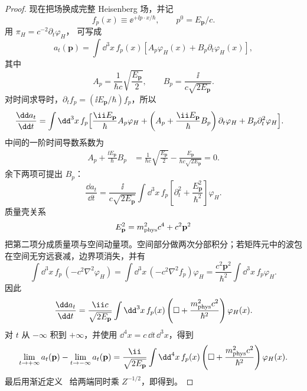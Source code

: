 \begin{proof}
现在把场换成完整 Heisenberg 场，并记
\begin{equation*}
 f_p(x)\equiv \ee^{+\ii p\cdot x/\hbar},
 \qquad p^0=E_{\mathbf p}/c.
\end{equation*}
用 $\pi_H=c^{-2}\partial_t\varphi_H$， 可写成
\begin{equation*}
 a_t(\mathbf p)
 =\int\dd^3 x\,f_p(x)
 \left[
 A_p\varphi_H(x)+B_p\partial_t\varphi_H(x)
 \right],
\end{equation*}
其中
\begin{equation*}
 A_p=\frac{1}{\hbar c}\sqrt{\frac{E_{\mathbf p}}{2}},
 \qquad
 B_p=\frac{\ii}{c\sqrt{2E_{\mathbf p}}}.
\end{equation*}
对时间求导时，$\partial_t f_p=(\ii E_{\mathbf p}/\hbar)f_p$，所以
\begin{align*}
 \frac{\dd a_t}{\dd t}
 =\int\dd^3 x\,f_p
 \Bigl[&\frac{\ii E_{\mathbf p}}{\hbar}A_p\varphi_H
 +\left(A_p+\frac{\ii E_{\mathbf p}}{\hbar}B_p\right)
 \partial_t\varphi_H
 +B_p\partial_t^2\varphi_H\Bigr].
\end{align*}
中间的一阶时间导数系数为
\begin{align*}
 A_p+\frac{\ii E_{\mathbf p}}{\hbar}B_p
 &=\frac{1}{\hbar c}\sqrt{\frac{E_{\mathbf p}}{2}}
 -\frac{E_{\mathbf p}}{\hbar c\sqrt{2E_{\mathbf p}}}=0.
\end{align*}
余下两项可提出 $B_p$：
\begin{equation*}
 \frac{\dd a_t}{\dd t}
 =\frac{\ii}{c\sqrt{2E_{\mathbf p}}}
 \int\dd^3 x\,f_p
 \left[
 \partial_t^2+\frac{E_{\mathbf p}^2}{\hbar^2}
 \right]\varphi_H.
\end{equation*}
质量壳关系
\begin{equation*}
 E_{\mathbf p}^2=m_{\rm phys}^2c^4+c^2\mathbf p^2
\end{equation*}
把第二项分成质量项与空间动量项。空间部分做两次分部积分；若矩阵元中的波包在空间无穷远衰减，边界项消失，并有
\begin{equation*}
 \int\dd^3 x\,f_p\,(-c^2\nabla^2\varphi_H)
 =\int\dd^3 x\,(-c^2\nabla^2 f_p)\varphi_H
 =\frac{c^2\mathbf p^2}{\hbar^2}
 \int\dd^3 x\,f_p\varphi_H.
\end{equation*}
因此
\begin{equation*}
 \frac{\dd a_t}{\dd t}
 =\frac{\ii c}{\sqrt{2E_{\mathbf p}}}
 \int\dd^3 x\,f_p(x)
 \left(\Box+\frac{m_{\rm phys}^2c^2}{\hbar^2}\right)
 \varphi_H(x).
\end{equation*}
对 $t$ 从 $-\infty$ 积到 $+\infty$，并使用 $\dd^4 x=c\,\dd t\,\dd^3 x$，得到
\begin{equation*}
 \lim_{t\to+\infty}a_t(\mathbf p)
 -\lim_{t\to-\infty}a_t(\mathbf p)
 =\frac{\ii}{\sqrt{2E_{\mathbf p}}}
 \int\dd^4 x\,f_p(x)
 \left(\Box+\frac{m_{\rm phys}^2c^2}{\hbar^2}\right)
 \varphi_H(x).
\end{equation*}
最后用渐近定义~ 给两端同时乘 $Z^{-1/2}$，即得到。


\end{proof}
